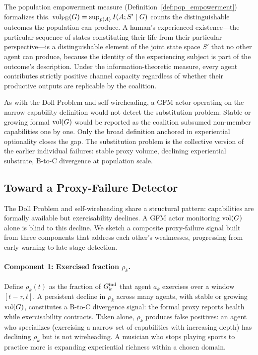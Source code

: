 The population empowerment measure (Definition~\ref{def:pop_empowerment})
formalizes this. $\operatorname{vol}_{\mathrm{PE}}(G) = \sup_{p(A)} I(A; S' \mid G)$ counts
the distinguishable outcomes the population can produce. A human's experienced
existence---the particular sequence of states constituting their life from
their particular perspective---is a distinguishable element of the joint state
space $S'$ that no other agent can produce, because the identity of the
experiencing subject is part of the outcome's description. Under the
information-theoretic measure, every agent contributes strictly positive
channel capacity regardless of whether their productive outputs are replicable
by the coalition.

As with the Doll Problem and self-wireheading, a GFM actor operating on the
narrow capability definition would not detect the substitution problem. Stable
or growing formal $\operatorname{vol}(G)$ would be reported as the coalition subsumed
non-member capabilities one by one. Only the broad definition anchored in
experiential optionality closes the gap. The substitution problem is the
collective version of the earlier individual failures: stable proxy volume,
declining experiential substrate, B-to-C divergence at population scale.

\subsection{Toward a Proxy-Failure Detector}
\label{sec:proxy_failure_detector}

The Doll Problem and self-wireheading share a structural pattern: capabilities
are formally available but exercisability declines. A GFM actor monitoring
$\operatorname{vol}(G)$ alone is blind to this decline. We sketch a composite
proxy-failure signal built from three components that address each other's
weaknesses, progressing from early warning to late-stage detection.

\paragraph{Component 1: Exercised fraction $\rho_k$.} Define $\rho_k(t)$ as
the fraction of $G_{k}^{\mathrm{ind}}$ that agent $a_k$ exercises over a window
$[t - \tau, t]$. A persistent decline in $\rho_k$ across many agents, with
stable or growing $\operatorname{vol}(G)$, constitutes a B-to-C divergence signal: the
formal proxy reports health while exercisability contracts. Taken alone,
$\rho_k$ produces false positives: an agent who specializes (exercising a
narrow set of capabilities with increasing depth) has declining $\rho_k$ but
is not wireheading. A musician who stops playing sports to practice more is
expanding experiential richness within a chosen domain.

